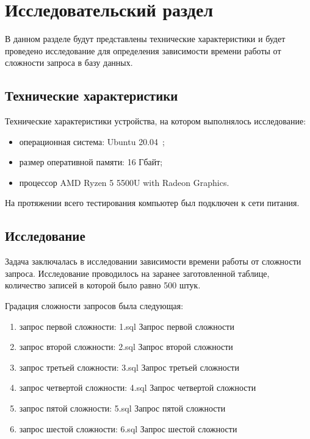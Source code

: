 \chapter{Исследовательский раздел}

В данном разделе будут представлены технические характеристики и будет проведено исследование для определения зависимости времени работы от сложности запроса в базу данных.

\section{Технические характеристики}
Технические характеристики устройства, на котором выполнялось исследование:
\begin{itemize}
	\item операционная система: Ubuntu 20.04~\cite{ubuntu};
	\item размер оперативной памяти: 16 Гбайт;
	\item процессор AMD Ryzen 5 5500U with Radeon Graphics.
\end{itemize}
	
На протяжении всего тестирования компьютер был подключен к сети питания.
\section{Исследование}
Задача заключалась в исследовании зависимости времени работы от сложности запроса.
Исследование проводилось на заранее заготовленной таблице, количество записей в которой было равно 500 штук.

Градация сложности запросов была следующая:
\begin{enumerate}
	\item запрос первой сложности:
		{1.sql}
		{Запрос первой сложности}
	\item запрос второй сложности:
		{2.sql}
		{Запрос второй сложности}
	\item запрос третьей сложности:
{3.sql}
{Запрос третьей сложности}
	\item запрос четвертой сложности:
{4.sql}
{Запрос четвертой сложности}
	\item запрос пятой сложности:
{5.sql}
{Запрос пятой сложности}
	\item запрос шестой сложности:
{6.sql}
{Запрос шестой сложности}
\end{enumerate}  

